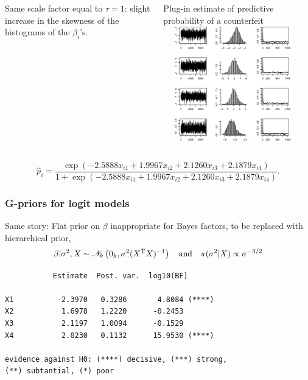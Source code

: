 \begin{slide}
\begin{columns}
Same scale factor equal to $\tau=1$: 
slight increase in the
skewness of the histograms of the $\beta_i$'s.

\vs Plug-in estimate of predictive probability of a counterfeit 
\includegraphics[width=6cm,height=5cm]{figures/hmflatlogit.eps}
\end{columns}
\small$$
\hat p_i=\frac{\exp\left(-2.5888x_{i1}+1.9967x_{i2}+2.1260x_{i3}+
2.1879x_{i4}\right)}{1+\exp\left(-2.5888x_{i1}+1.9967x_{i2}+2.1260x_{i3}+2.1879x_{i4}\right)}.
$$\normalsize

\end{slide}
\begin{frame}[fragile]
\frametitle{G-priors for logit models}

Same story: Flat prior on $\beta$ inappropriate for 
Bayes factors, to be replaced with hierarchical prior,
\small
$$
\beta|\sigma^2,X\sim\mathscr{N}_k\left(0_k,\sigma^2(X^{\mathrm{T}} X)^{-1}\right)
\quad\text{and}\quad
\pi(\sigma^2|X)\propto \sigma^{-3/2}
$$

\begin{example}[{\sf bank}]
\begin{verbatim}
           Estimate  Post. var.  log10(BF)

X1          -2.3970   0.3286       4.8084 (****)
X2           1.6978   1.2220      -0.2453
X3           2.1197   1.0094      -0.1529
X4           2.0230   0.1132      15.9530 (****)

evidence against H0: (****) decisive, (***) strong,
(**) subtantial, (*) poor
\end{verbatim}

\end{example}
\normalsize

\end{frame}
